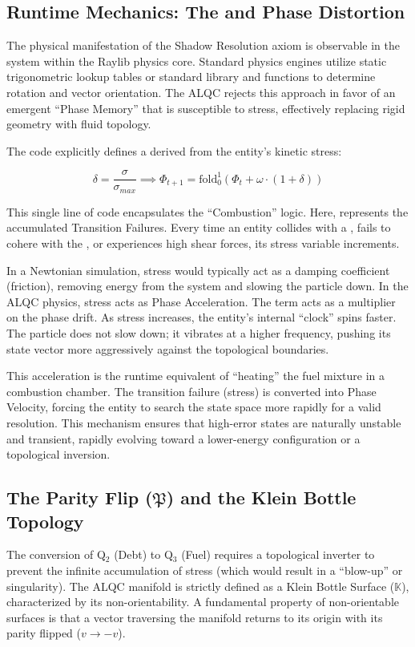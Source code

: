 \documentclass[11pt, letterpaper]{article}
\begin{document}
\subsection{Runtime Mechanics: The  and Phase Distortion}\label{appendixH.2}
The physical manifestation of the Shadow Resolution axiom is observable in the  system within the Raylib physics core. Standard physics engines utilize static trigonometric lookup tables or standard library  and  functions to determine rotation and vector orientation. The ALQC rejects this approach in favor of an emergent ``Phase Memory'' that is susceptible to stress, effectively replacing rigid geometry with fluid topology.

The code explicitly defines a  derived from the entity's kinetic stress:

\[
\delta = \frac{\sigma}{\sigma_{max}} \implies \Phi_{t+1} = \text{fold}_{0}^{1} \left( \Phi_t + \omega \cdot (1 + \delta) \right)
\]

This single line of code encapsulates the ``Combustion'' logic. Here,  represents the accumulated Transition Failures. Every time an entity collides with a , fails to cohere with the , or experiences high shear forces, its stress variable increments.

In a Newtonian simulation, stress would typically act as a damping coefficient (friction), removing energy from the system and slowing the particle down. In the ALQC physics, stress acts as Phase Acceleration. The term  acts as a multiplier on the phase drift. As stress increases, the entity's internal ``clock'' spins faster. The particle does not slow down; it vibrates at a higher frequency, pushing its state vector more aggressively against the topological boundaries.

This acceleration is the runtime equivalent of ``heating'' the fuel mixture in a combustion chamber. The transition failure (stress) is converted into Phase Velocity, forcing the entity to search the state space more rapidly for a valid resolution. This mechanism ensures that high-error states are naturally unstable and transient, rapidly evolving toward a lower-energy configuration or a topological inversion.

\subsection{The Parity Flip ($\mathfrak{P}$) and the Klein Bottle Topology}\label{appendixH.3}
The conversion of Q$_2$ (Debt) to Q$_3$ (Fuel) requires a topological inverter to prevent the infinite accumulation of stress (which would result in a ``blow-up'' or singularity). The ALQC manifold is strictly defined as a Klein Bottle Surface ($\mathbb{K}$), characterized by its non-orientability. A fundamental property of non-orientable surfaces is that a vector traversing the manifold returns to its origin with its parity flipped ($v \to -v$).
\end{document}
